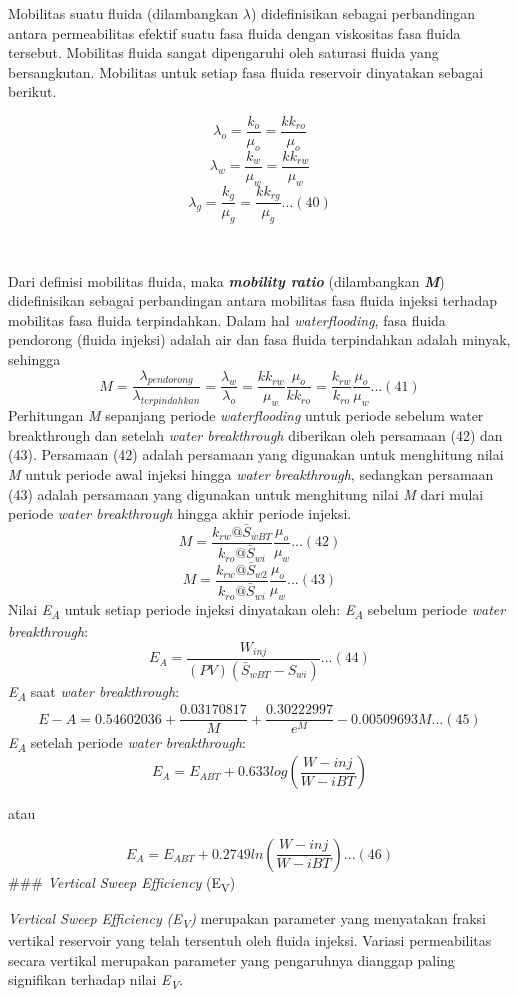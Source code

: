 \documentclass[
]{book}
\begin{document}
Mobilitas suatu fluida (dilambangkan \(\lambda\)) didefinisikan sebagai perbandingan antara permeabilitas efektif suatu fasa fluida dengan viskositas fasa fluida tersebut. Mobilitas fluida sangat dipengaruhi oleh saturasi fluida yang bersangkutan. Mobilitas untuk setiap fasa fluida reservoir dinyatakan sebagai berikut.

\[\lambda_o = \frac{k_o}{\mu_o}=\frac{kk_{ro}}{\mu_o}\]
\[\lambda_w = \frac{k_w}{\mu_w}=\frac{kk_{rw}}{\mu_w}\]
\[\lambda_g = \frac{k_g}{\mu_g}=\frac{kk_{rg}}{\mu_g}...(40)\]

~

Dari definisi mobilitas fluida, maka \textbf{\emph{mobility ratio}} (dilambangkan \textbf{\emph{M}}) didefinisikan sebagai perbandingan antara mobilitas fasa fluida injeksi terhadap mobilitas fasa fluida terpindahkan. Dalam hal \emph{waterflooding}, fasa fluida pendorong (fluida injeksi) adalah air dan fasa fluida terpindahkan adalah minyak, sehingga
\[M = \frac{\lambda_{pendorong}}{\lambda_{terpindahkan}}=\frac{\lambda_w}{\lambda_o}=\frac{kk_{rw}}{\mu_w}\frac{\mu_o}{kk_{ro}}=\frac{k_{rw}}{k_{ro}}\frac{\mu_o}{\mu_w}...(41)\]
Perhitungan \emph{M} sepanjang periode \emph{waterflooding} untuk periode sebelum water breakthrough dan setelah \emph{water breakthrough} diberikan oleh persamaan (42) dan (43). Persamaan (42) adalah persamaan yang digunakan untuk menghitung nilai \emph{M} untuk periode awal injeksi hingga \emph{water breakthrough}, sedangkan persamaan (43) adalah persamaan yang digunakan untuk menghitung nilai \emph{M} dari mulai periode \emph{water breakthrough} hingga akhir periode injeksi.
\[M= \frac{k_{rw}@\bar S_{wBT}}{k_{ro}@\bar S_{wi}}\frac{\mu_o}{\mu_w}...(42)\]
\[M= \frac{k_{rw}@\bar S_{w2}}{k_{ro}@\bar S_{wi}}\frac{\mu_o}{\mu_w}...(43)\]
Nilai \emph{E\textsubscript{A}} untuk setiap periode injeksi dinyatakan oleh:
\emph{E\textsubscript{A}} sebelum periode \emph{water breakthrough}:
\[E_A = \frac{W_{inj}}{(PV)(\bar S_{wBT}- S_{wi})}...(44)\]
\emph{E\textsubscript{A}} saat \emph{water breakthrough}:
\[E-A = 0.54602036 + \frac{0.03170817}{M} + \frac{0.30222997}{e^M} - 0.00509693M...(45)\]
\emph{E\textsubscript{A}} setelah periode \emph{water breakthrough}:
\[E_A = E_{ABT} + 0.633log\left( \frac{W-{inj}}{W-{iBT}} \right)\]

atau

\[E_A = E_{ABT} + 0.2749ln\left( \frac{W-{inj}}{W-{iBT}} \right)...(46)\]
\#\#\# \emph{Vertical Sweep Efficiency} (E\textsubscript{V})

\emph{Vertical Sweep Efficiency} \emph{(E\textsubscript{V})} merupakan parameter yang menyatakan fraksi vertikal reservoir yang telah tersentuh oleh fluida injeksi. Variasi permeabilitas secara vertikal merupakan parameter yang pengaruhnya dianggap paling signifikan terhadap nilai \emph{E\textsubscript{V}}.
\end{document}
